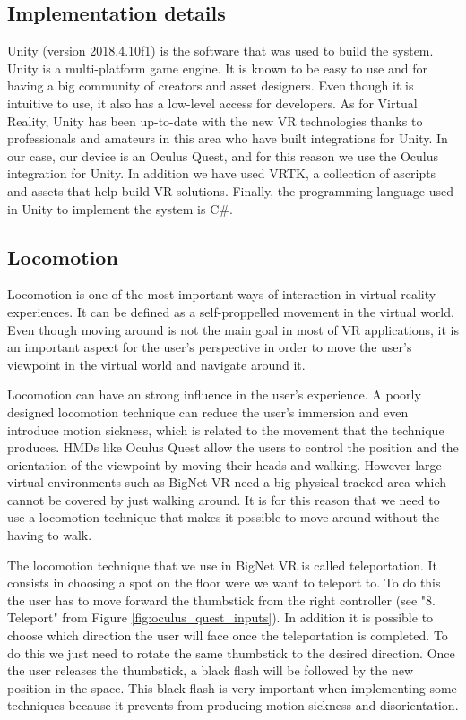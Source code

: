 \subsection{Implementation details}
Unity (version 2018.4.10f1\cite{unity2018}) is the software that was used to build the system. Unity is a multi-platform game engine. It is known to be easy to use and for having a big community of creators and asset designers\cite{developing_vr_unity}. Even though it is intuitive to use, it also has a low-level access for developers. As for Virtual Reality, Unity has been up-to-date with the new VR technologies thanks to professionals and amateurs in this area who have built integrations for Unity. In our case, our device is an Oculus Quest, and for this reason we use the Oculus integration for Unity\cite{oculus_unity_integration}. In addition we have used VRTK, a collection of ascripts and assets that help build VR solutions\cite{vrtk-what}. Finally, the programming language used in Unity to implement the system is C\#.

\subsection{Locomotion}
Locomotion is one of the most important ways of interaction in virtual reality experiences. It can be defined as a self-proppelled movement in the virtual world. Even though moving around is not the main goal in most of VR applications, it is an important aspect for the user's perspective in order to move the user's viewpoint in the virtual world and navigate around it.

Locomotion can have an strong influence in the user's experience. A poorly designed locomotion technique can reduce the user's immersion and even introduce motion sickness, which is related to the movement that the technique produces. HMDs like Oculus Quest allow the users to control the position and the orientation of the viewpoint by moving their heads and walking. However large virtual environments such as BigNet VR need a big physical tracked area which cannot be covered by just walking around. It is for this reason that we need to use a locomotion technique that makes it possible to move around without the having to walk\cite{locomotion_technique}.

The locomotion technique that we use in BigNet VR is called teleportation. It consists in choosing a spot on the floor were we want to teleport to. To do this the user has to move forward the thumbstick from the right controller (see "8. Teleport" from Figure \ref{fig:oculus_quest_inputs}). In addition it is possible to choose which direction the user will face once the teleportation is completed. To do this we just need to rotate the same thumbstick to the desired direction. Once the user releases the thumbstick, a black flash will be followed by the new position in the space. This black flash is very important when implementing some techniques because it prevents from producing motion sickness and disorientation.

